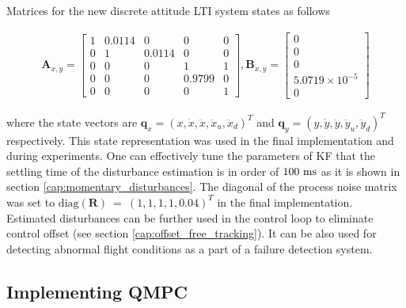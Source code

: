 Matrices for the new discrete attitude LTI system states as follows	

\begin{equation}
\begin{split}
\mathbf{A}_{x, y} = \begin{bmatrix}
1 & 0.0114 & 0 & 0 & 0 \\
0 & 1 & 0.0114 & 0 & 0\\
0 & 0 & 0 & 1 & 1 \\
0 & 0 & 0 & 0.9799 & 0 \\
0 & 0 & 0 & 0 & 1
\end{bmatrix}, \mathbf{B}_{x, y} = \begin{bmatrix}
0\\
0\\
0\\
5.0719 \times 10^{-5}\\
0
\end{bmatrix}
\end{split}
\label{eq:attitude_LTI_big_identified}
\end{equation}

where the state vectors are $\mathbf{q}_{x} = \left(x, \dot{x}, \ddot{x}, \ddot{x}_u, \ddot{x}_d\right)^T$ and $\mathbf{q}_{y} = \left(y, \dot{y}, \ddot{y}, \ddot{y}_u, \ddot{y}_d\right)^T$ respectively. This state representation was used in the final implementation and during experiments. One can effectively tune the parameters of KF that the settling time of the disturbance estimation is in order of $100~\mathrm{ms}$ as it is shown in section \ref{cap:momentary_disturbances}. The diagonal of the process noise matrix was set to $\mathrm{diag}(\textbf{R})~=~\left(1, 1, 1, 1, 0.04\right)^T$ in the final implementation. Estimated disturbances can be further used in the control loop to eliminate control offset (see section \ref{cap:offset_free_tracking}). It can be also used for detecting abnormal flight conditions as a part of a failure detection system.
 
\subsection{Implementing QMPC}

